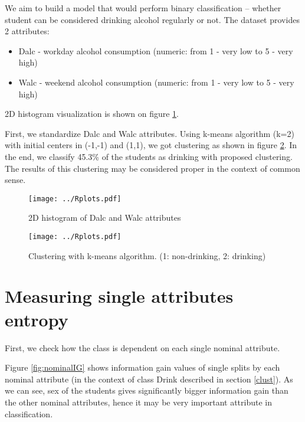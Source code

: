 \documentclass[a4paper]{article}
\begin{document}
We aim to build a model that would perform binary classification --
whether student can be considered drinking alcohol regularly or not.
The dataset provides 2 attributes:
\begin{itemize}
    \item Dalc - workday alcohol consumption (numeric: from 1 - very low to 5 - very high)
    \item Walc - weekend alcohol consumption (numeric: from 1 - very low to 5 - very high)
\end{itemize}
2D histogram visualization is shown on figure \ref{fig:hist2D}.

First, we standardize Dalc and Walc attributes.
Using k-means algorithm (k=2) with initial centers in (-1,-1) and (1,1), we got clustering as shown in figure \ref{fig:clust}.
In the end, we classify 45.3\% of the students as drinking with proposed clustering.
The results of this clustering may be considered proper in the context of common sense.



\begin{figure}[!hbt]
    \centering
    \texttt{[image: ../Rplots.pdf]}
    \caption[]{2D histogram of Dalc and Walc attributes
    \label{fig:hist2D}
    }
\end{figure}

\begin{figure}[!hbt]
    \centering
    \texttt{[image: ../Rplots.pdf]}
    \caption[]{Clustering with k-means algorithm. (1: non-drinking, 2: drinking)
    \label{fig:clust}
    }
\end{figure}

\section{Measuring single attributes entropy}
\label{xent}
First, we check how the class is dependent on each single nominal attribute.

Figure \ref{fig:nominalIG} shows information gain values
of single splits by each nominal attribute (in the context of class Drink described in section \ref{clust}).
As we can see, sex of the students gives significantly bigger information gain
than the other nominal attributes, hence it may be very important attribute
in classification.
\end{document}
